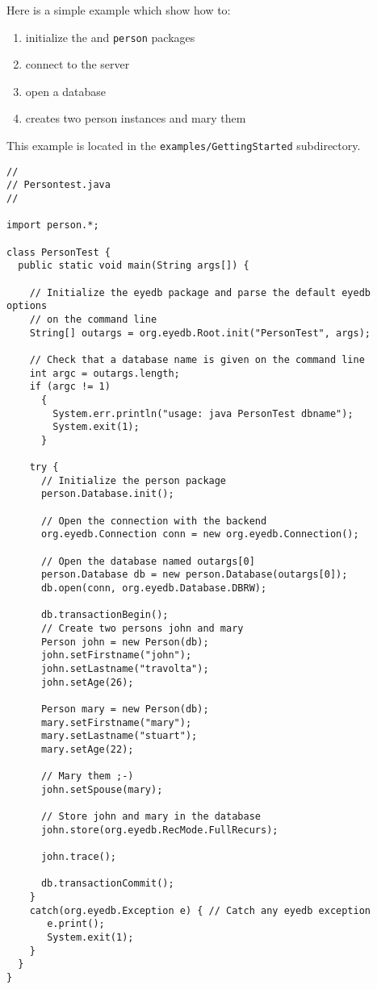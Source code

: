 Here is a simple example which show how to:
\begin{enumerate}
\item initialize the \eyedb and \texttt{person} packages
\item connect to the \eyedb server
\item open a database
\item creates two person instances and mary them
\end{enumerate}

This example is located in the \texttt{examples/GettingStarted} subdirectory.


\verbsize \begin{verbatim}
//
// Persontest.java
//

import person.*;

class PersonTest {
  public static void main(String args[]) {

    // Initialize the eyedb package and parse the default eyedb options
    // on the command line
    String[] outargs = org.eyedb.Root.init("PersonTest", args);
     
    // Check that a database name is given on the command line
    int argc = outargs.length;
    if (argc != 1)
      {
        System.err.println("usage: java PersonTest dbname");
        System.exit(1);
      }

    try {
      // Initialize the person package
      person.Database.init();

      // Open the connection with the backend
      org.eyedb.Connection conn = new org.eyedb.Connection();

      // Open the database named outargs[0]
      person.Database db = new person.Database(outargs[0]);
      db.open(conn, org.eyedb.Database.DBRW);

      db.transactionBegin();
      // Create two persons john and mary
      Person john = new Person(db);
      john.setFirstname("john");
      john.setLastname("travolta");
      john.setAge(26);
     
      Person mary = new Person(db);
      mary.setFirstname("mary");
      mary.setLastname("stuart");
      mary.setAge(22);
     
      // Mary them ;-)
      john.setSpouse(mary);

      // Store john and mary in the database
      john.store(org.eyedb.RecMode.FullRecurs);

      john.trace();

      db.transactionCommit();
    }
    catch(org.eyedb.Exception e) { // Catch any eyedb exception
       e.print();
       System.exit(1);
    }
  }
}
\end{verbatim}
\normalsize


